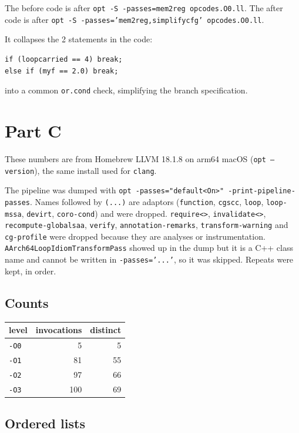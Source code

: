 \documentclass[11pt,a4paper]{article}
\begin{document}
The before code is after \texttt{opt -S -passes=mem2reg opcodes.O0.ll}.
The after code is after
\texttt{opt -S -passes='mem2reg,simplifycfg' opcodes.O0.ll}.

It collapses the 2 statements in the code:

\begin{lstlisting}[language={}]
if (loopcarried == 4) break;
else if (myf == 2.0) break;
\end{lstlisting}

into a common \texttt{or.cond} check, simplifying the branch specification.

\section{Part C}

These numbers are from Homebrew LLVM 18.1.8 on arm64 macOS
(\texttt{opt --version}), the same install used for \texttt{clang}.

The pipeline was dumped with
\texttt{opt -passes="default<On>" -print-pipeline-passes}.
Names followed by \texttt{(...)} are adaptors
(\texttt{function}, \texttt{cgscc}, \texttt{loop}, \texttt{loop-mssa},
\texttt{devirt}, \texttt{coro-cond}) and were dropped.
\texttt{require<>}, \texttt{invalidate<>}, \texttt{recompute-globalsaa},
\texttt{verify}, \texttt{annotation-remarks}, \texttt{transform-warning} and
\texttt{cg-profile} were dropped because they are analyses or instrumentation.
\texttt{AArch64LoopIdiomTransformPass} showed up in the dump but it is a C++
class name and cannot be written in \texttt{-passes='...'}, so it was skipped.
Repeats were kept, in order.

\subsection*{Counts}

\begin{tabular}{lrr}
\hline
level & invocations & distinct \\
\hline
\texttt{-O0} & 5 & 5 \\
\texttt{-O1} & 81 & 55 \\
\texttt{-O2} & 97 & 66 \\
\texttt{-O3} & 100 & 69 \\
\hline
\end{tabular}

\subsection*{Ordered lists}
\end{document}
